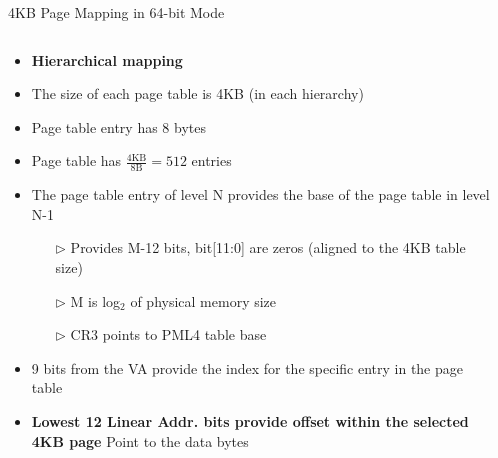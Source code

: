 \documentclass[aspectratio=169,12pt]{beamer}
\begin{document}
\begin{frame}{4KB Page Mapping in 64-bit Mode}
\begin{columns}[T]
\begin{column}{0.44\textwidth}
\begin{itemize}
\item \textbf{Hierarchical mapping}
\item The size of each page table is 4KB (in each hierarchy)
\item Page table entry has 8 bytes
\item Page table has $\frac{4\text{KB}}{8\text{B}}=512$ entries
\item The page table entry of level N provides the base of the page table in level N-1
    \begin{itemize}
    \item[$\triangleright$] Provides M-12 bits, bit[11:0] are zeros (aligned to the 4KB table size)
    \item[$\triangleright$] M is log$_2$ of physical memory size
    \item[$\triangleright$] CR3 points to PML4 table base
    \end{itemize}
\item 9 bits from the VA provide the index for the specific entry in the page table
\item \textbf{Lowest 12 Linear Addr. bits provide offset within the selected 4KB page} Point to the data bytes
\end{itemize}
\end{column}

\begin{column}{0.56\textwidth}
\begin{center}
\end{center}
\end{column}
\end{columns}
\end{frame}
\end{document}
